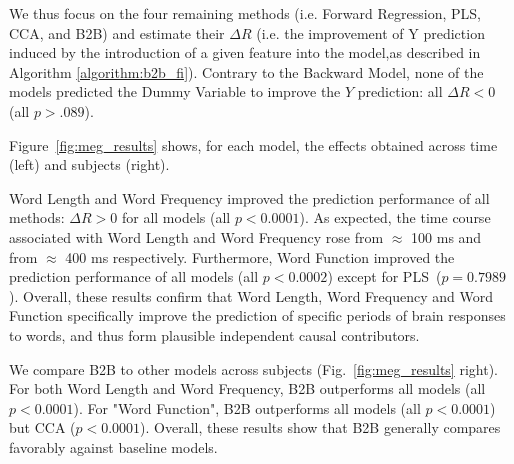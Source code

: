 We thus focus on the four remaining methods (i.e. Forward Regression, PLS, CCA,
and B2B) and estimate their $\Delta R$ (i.e. the improvement of Y prediction
induced by the introduction of a given feature into the model,as described in
Algorithm \ref{algorithm:b2b_fi}). Contrary to the Backward Model, none of the
models predicted the Dummy Variable to improve the $Y$ prediction: all $\Delta R
< 0$ (all $p > .089$).

Figure~\ref{fig:meg_results} shows, for each model, the effects obtained across
time (left) and subjects (right).

Word Length and Word Frequency improved the prediction performance of all
methods: $\Delta R>0$ for all models (all $p<0.0001$). As expected, the time
course associated with Word Length and Word Frequency rose from $\approx$ 100 ms
and from $\approx$ 400 ms respectively. Furthermore, Word Function improved the
prediction performance of all models (all $p < 0.0002$) except for
PLS~($p=0.7989$). Overall, these results confirm that Word Length, Word
Frequency and Word Function specifically improve the prediction of specific periods of brain
responses to words, and thus form plausible independent causal contributors.

We compare B2B to other models across subjects (Fig.~\ref{fig:meg_results}
right). For both Word Length and Word Frequency, B2B outperforms all models (all $p < 0.0001$).
For "Word Function", B2B outperforms all models (all $p < 0.0001$) but CCA ($p<0.0001$).
Overall, these results show that B2B generally compares favorably against baseline models.
